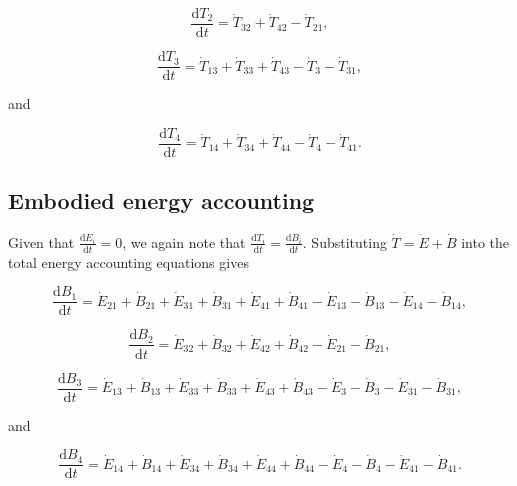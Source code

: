 \documentclass[authoryear,preprint,review,12pt]{elsarticle}
\begin{document}
\begin{equation} \label{eq:C-CV_T_2}
	\frac{\mathrm{d}T_{2}}{\mathrm{d}t} 	 = \dot{T}_{32} + \dot{T}_{42} - \dot{T}_{21},
\end{equation}

\begin{equation} \label{eq:C-CV_T_3}
	\frac{\mathrm{d}T_{3}}{\mathrm{d}t} 	 = \dot{T}_{13} + \dot{T}_{33} + \dot{T}_{43} - \dot{T}_{3} - \dot{T}_{31},
\end{equation}

\noindent and 

\begin{equation} \label{eq:C-CV_T_4}
	\frac{\mathrm{d}T_{4}}{\mathrm{d}t} 	 = \dot{T}_{14} + \dot{T}_{34} + \dot{T}_{44} - \dot{T}_{4} - \dot{T}_{41}.
\end{equation}

\subsection{Embodied energy accounting}

Given that $\frac{\mathrm{d}E_{i}}{\mathrm{d}t} = 0$, we again note that $\frac{\mathrm{d}T_i}{\mathrm{d}t} = \frac{\mathrm{d}B_i}{\mathrm{d}t}$. Substituting $\dot{T} = \dot{E} + \dot{B}$ into the total energy accounting equations gives

\begin{equation} \label{eq:C-CV_dB_1}
	\frac{\mathrm{d}B_{1}}{\mathrm{d}t} 	 = \dot{E}_{21} + \dot{B}_{21} + \dot{E}_{31} + \dot{B}_{31} + \dot{E}_{41} + \dot{B}_{41} - \dot{E}_{13} - \dot{B}_{13} - \dot{E}_{14} - \dot{B}_{14},
\end{equation}

\begin{equation} \label{eq:C-CV_dB_2}
	\frac{\mathrm{d}B_{2}}{\mathrm{d}t} 	 = \dot{E}_{32} + \dot{B}_{32} + \dot{E}_{42} + \dot{B}_{42} - \dot{E}_{21} - \dot{B}_{21},
\end{equation}

\begin{equation} \label{eq:C-CV_dB_3}
	\frac{\mathrm{d}B_{3}}{\mathrm{d}t} 	 = \dot{E}_{13} + \dot{B}_{13} + \dot{E}_{33} + \dot{B}_{33} + \dot{E}_{43} + \dot{B}_{43} - \dot{E}_{3} - \dot{B}_{3} - \dot{E}_{31} - \dot{B}_{31},
\end{equation}

\noindent and 

\begin{equation} \label{eq:C-CV_dB_4}
	\frac{\mathrm{d}B_{4}}{\mathrm{d}t} 	 = \dot{E}_{14} + \dot{B}_{14} + \dot{E}_{34} + \dot{B}_{34} + \dot{E}_{44} + \dot{B}_{44} - \dot{E}_{4} - \dot{B}_{4} - \dot{E}_{41} - \dot{B}_{41}.
\end{equation}
\end{document}
